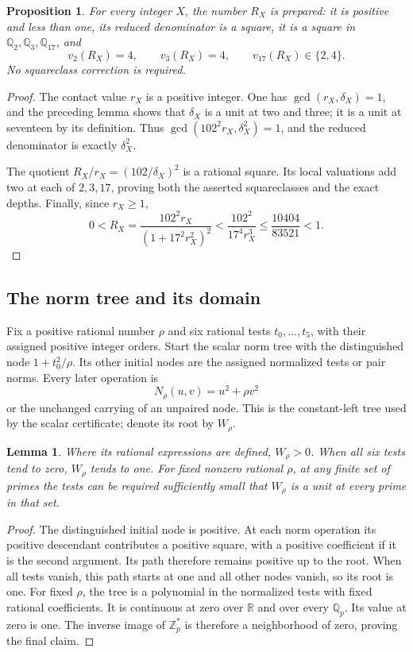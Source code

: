 \documentclass[11pt,a4paper]{article}
\newtheorem{lemma}[theorem]{Lemma}
\newtheorem{proposition}[theorem]{Proposition}
\theoremstyle{definition}
\theoremstyle{remark}
\begin{document}
\begin{proposition}\label{sn:prepared-constant}
For every integer $X$, the number $R_X$ is prepared: it is
positive and less than one, its reduced denominator is a square,
it is a square in $\mathbb Q_2,\mathbb Q_3,\mathbb Q_{17}$,
and
\[
 v_2(R_X)=4,\qquad v_3(R_X)=4,\qquad
 v_{17}(R_X)\in\{2,4\}.
\]
No squareclass correction is required.
\end{proposition}
\begin{proof}
The contact value $r_X$ is a positive integer.  One has
$\gcd(r_X,\delta_X)=1$, and the preceding lemma shows that
$\delta_X$ is a unit at two and three; it is a unit at
seventeen by its definition.  Thus
$\gcd(102^2r_X,\delta_X^2)=1$, and the reduced denominator
is exactly $\delta_X^2$.

The quotient $R_X/r_X=(102/\delta_X)^2$ is a rational square.
Its local valuations add two at each of $2,3,17$, proving
both the asserted squareclasses and the exact depths.  Finally,
since $r_X\ge1$,
\[
 0<R_X=
 \frac{102^2r_X}{(1+17^2r_X^2)^2}
 <\frac{102^2}{17^4r_X^3}
 \le\frac{10404}{83521}<1.
\]
\end{proof}

\subsection{The norm tree and its domain}

Fix a positive rational number $\rho$ and six rational tests
$t_0,\ldots,t_5$, with their assigned positive integer orders.
Start the scalar norm tree with the distinguished node
$1+t_0^2/\rho$.  Its other initial nodes are the assigned
normalized tests or pair norms.  Every later operation is
\[
                  N_\rho(u,v)=u^2+\rho v^2
\]
or the unchanged carrying of an unpaired node.  This is the
constant-left tree used by the scalar certificate; denote its
root by $W_\rho$.

\begin{lemma}\label{sn:positive-root}
Where its rational expressions are defined, $W_\rho>0$.
When all six tests tend to zero, $W_\rho$ tends to one.
For fixed nonzero rational $\rho$, at any finite set of primes
the tests can be required sufficiently small that
$W_\rho$ is a unit at every prime in that set.
\end{lemma}
\begin{proof}
The distinguished initial node is positive.  At each norm
operation its positive descendant contributes a positive
square, with a positive coefficient if it is the second
argument.  Its path therefore remains positive up to the
root.  When all tests vanish, this path starts at one and
all other nodes vanish, so its root is one.  For fixed
$\rho$, the tree is a polynomial in the normalized tests
with fixed rational coefficients.  It is continuous at zero
over $\mathbb R$ and over every $\mathbb Q_p$.
Its value at zero is one.  The inverse image of $\mathbb Z_p^*$
is therefore a neighborhood of zero, proving the final claim.
\end{proof}
\end{document}

